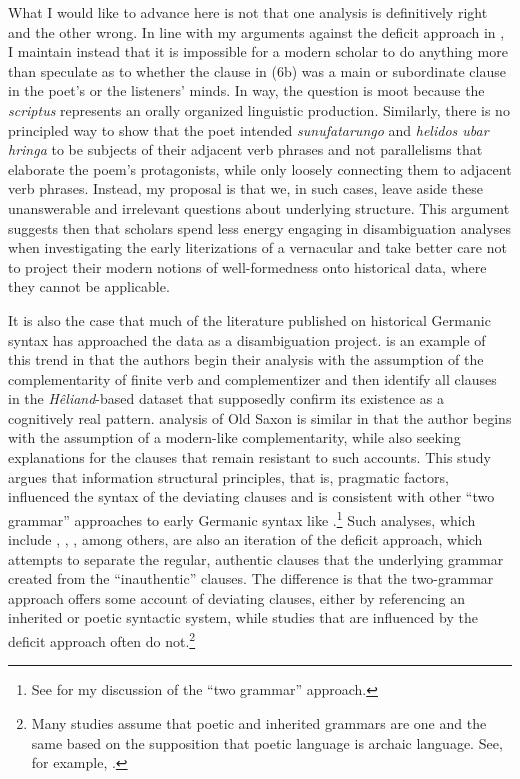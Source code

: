What I would like to advance here is not that one analysis is definitively right and the other wrong. In line with my arguments against the deficit approach in , I maintain instead that it is impossible for a modern scholar to do anything more than speculate as to whether the clause in (6b) was a main or subordinate clause in the poet’s or the listeners’ minds. In way, the question is moot because the \textit{scriptus} represents an orally organized linguistic production. Similarly, there is no principled way to show that the poet intended \textit{sunufatarungo} and \textit{helidos ubar hringa} to be subjects of their adjacent verb phrases and not parallelisms that elaborate the poem’s protagonists, while only loosely connecting them to adjacent verb phrases. Instead, my proposal is that we, in such cases, leave aside these unanswerable and irrelevant questions about underlying structure. This argument suggests then that scholars spend less energy engaging in disambiguation analyses when investigating the early literizations of a vernacular and take better care not to project their modern notions of well-formedness onto historical data, where they cannot be applicable.

It is also the case that much of the literature published on historical Germanic syntax has approached the data as a disambiguation project. \citet{SomersDubenion-Smith2014} is an example of this trend in that the authors begin their analysis with the assumption of the complementarity of finite verb and complementizer and then identify all clauses in the \textit{Hêliand}{}-based dataset that supposedly confirm its existence as a cognitively real pattern.  analysis of Old Saxon is similar in that the author begins with the assumption of a modern-like complementarity, while also seeking explanations for the clauses that remain resistant to such accounts. This study argues that information structural principles, that is, pragmatic factors, influenced the syntax of the deviating clauses and is consistent with other “two grammar” approaches to early Germanic syntax like \citet{Lenerz1985}.\footnote{{See  for my discussion of the “two grammar” approach.}} Such analyses, which include \citet{Schlachter2012}, \citet{Lötscher2009}, \citet{PetrovaSolf2009}, among others, are also an iteration of the deficit approach, which attempts to separate the regular, authentic clauses that the underlying grammar created from the “inauthentic” clauses. The difference is that the two-grammar approach offers some account of deviating clauses, either by referencing an inherited or poetic syntactic system, while studies that are influenced by the deficit approach often do not.\footnote{{Many studies assume that poetic and inherited grammars are one and the same based on the supposition that poetic language is archaic language. See, for example, \citet[315]{Lötscher2009}.} }

